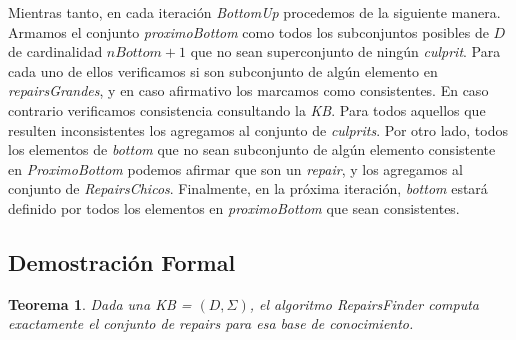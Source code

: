 \documentclass[11pt,a4paper,twoside]{tesis}
\begin{document}
Mientras tanto, en cada iteración \textit{BottomUp} procedemos de la siguiente manera. Armamos el conjunto \textit{proximoBottom} como todos los subconjuntos posibles de $D$ de cardinalidad $nBottom + 1$ que no sean superconjunto de ningún \textit{culprit}. Para cada uno de ellos verificamos si son subconjunto de algún elemento en \textit{repairsGrandes}, y en caso afirmativo los marcamos como consistentes. En caso contrario verificamos consistencia consultando la \textit{KB}. Para todos aquellos que resulten inconsistentes los agregamos al conjunto de \textit{culprits}. Por otro lado, todos los elementos de \textit{bottom} que no sean subconjunto de algún elemento consistente en \textit{ProximoBottom} podemos afirmar que son un \textit{repair}, y los agregamos al conjunto de \textit{RepairsChicos}. Finalmente, en la próxima iteración, \textit{bottom} estará definido por todos los elementos en \textit{proximoBottom} que sean consistentes.

\subsection{Demostración Formal}

\newtheorem{theorem}{Teorema} 
\newtheorem{lemma}[theorem]{Lema}

\begin{theorem}
Dada una \textit{KB} = $(D, \Sigma)$, el algoritmo \textit{RepairsFinder} computa exactamente el conjunto de \textit{repairs} para esa base de conocimiento.
\end{theorem}
\end{document}
